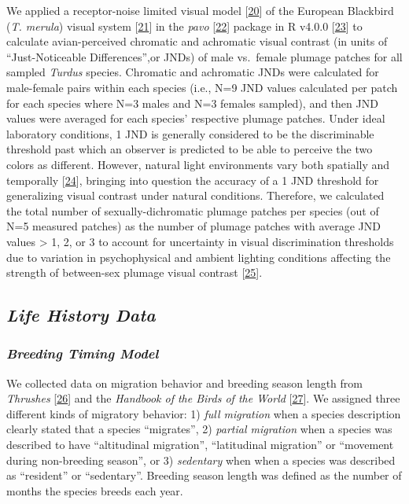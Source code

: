 \documentclass[
  a4paper,
]{article}
\begin{document}
We applied a receptor-noise limited visual model
{[}\protect\hyperlink{ref-vorobyev1998}{20}{]} of the European Blackbird
(\emph{T. merula}) visual system
{[}\protect\hyperlink{ref-hart2000}{21}{]} in the \emph{pavo}
{[}\protect\hyperlink{ref-maia2019}{22}{]}⁠ package in R v4.0.0
{[}\protect\hyperlink{ref-rcoreteam2020}{23}{]}⁠ to calculate
avian-perceived chromatic and achromatic visual contrast (in units of
``Just-Noticeable Differences'',or JNDs) of male vs.~female plumage
patches for all sampled \emph{Turdus} species. Chromatic and achromatic
JNDs were calculated for male-female pairs within each species (i.e.,
N=9 JND values calculated per patch for each species where N=3 males and
N=3 females sampled), and then JND values were averaged for each
species' respective plumage patches. Under ideal laboratory conditions,
1 JND is generally considered to be the discriminable threshold past
which an observer is predicted to be able to perceive the two colors as
different. However, natural light environments vary both spatially and
temporally {[}\protect\hyperlink{ref-endler1993}{24}{]}⁠, bringing into
question the accuracy of a 1 JND threshold for generalizing visual
contrast under natural conditions. Therefore, we calculated the total
number of sexually-dichromatic plumage patches per species (out of N=5
measured patches) as the number of plumage patches with average JND
values \textgreater{} 1, 2, or 3 to account for uncertainty in visual
discrimination thresholds due to variation in psychophysical and ambient
lighting conditions affecting the strength of between-sex plumage visual
contrast {[}\protect\hyperlink{ref-kemp2015}{25}{]}⁠.

\hypertarget{life-history-data}{%
\subsection{\texorpdfstring{\emph{Life History
Data}}{Life History Data}}\label{life-history-data}}

\hypertarget{breeding-timing-model}{%
\subsubsection{\texorpdfstring{\emph{Breeding Timing
Model}}{Breeding Timing Model}}\label{breeding-timing-model}}

We collected data on migration behavior and breeding season length from
\emph{Thrushes} {[}\protect\hyperlink{ref-clement2000}{26}{]} and the
\emph{Handbook of the Birds of the World}
{[}\protect\hyperlink{ref-delhoyo2017}{27}{]}⁠. We assigned three
different kinds of migratory behavior: 1) \emph{full migration} when a
species description clearly stated that a species ``migrates'', 2)
\emph{partial migration} when a species was described to have
``altitudinal migration'', ``latitudinal migration'' or ``movement
during non-breeding season'', or 3) \emph{sedentary} when when a species
was described as ``resident'' or ``sedentary''. Breeding season length
was defined as the number of months the species breeds each year.
\end{document}
